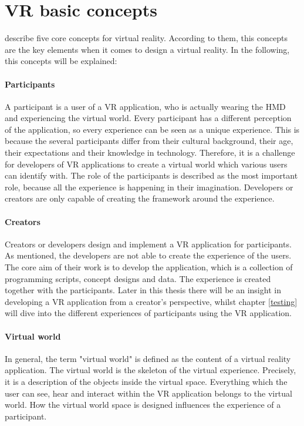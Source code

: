 \section{VR basic concepts}
\cite{Sherman.2019} describe five core concepts for virtual reality.  According to them, this concepts are the key elements when it comes to design a virtual reality. In the following, this concepts will be explained:
\paragraph{Participants} A participant is a user of a VR application, who is actually wearing the HMD and experiencing the virtual world. Every participant has a different perception of the application, so every experience can be seen as a unique experience. This is because the several participants differ from their cultural background, their age, their expectations and their knowledge in technology. Therefore, it is a challenge for developers of VR applications to create a virtual world which various users can identify with. The role of the participants is described as the most important role, because all the experience is happening in their imagination. Developers or creators are only capable of creating the framework around the experience.
\paragraph{Creators} Creators or developers design and implement a VR application for participants. As mentioned, the developers are not able to create the experience of the users. The core aim of their work is to develop the application, which is a collection of programming scripts, concept designs and data. The experience is created together with the participants. Later in this thesis there will be an insight in developing a VR application from a creator's perspective, whilst chapter \ref{testing} will dive into the different experiences of participants using the VR application.
\paragraph{Virtual world} In general, the term "virtual world" is defined as the content of a virtual reality application.  The virtual world is the skeleton of the virtual experience. Precisely, it is a description of the objects inside the virtual space. Everything which the user can see, hear and interact within the VR application belongs to the virtual world. How the virtual world space is designed influences the experience of a participant.

